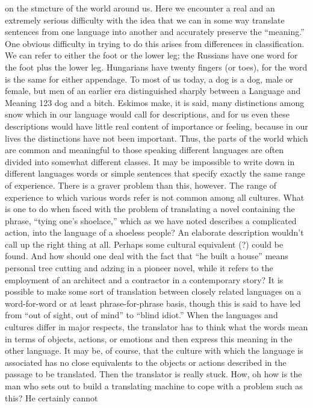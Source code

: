 {{{on the stmcture of the world around us. Here we encounter
a real and an extremely serious difficulty with the idea that we can
in some way translate sentences from one language into another
and accurately preserve the “meaning.”
One obvious difficulty in trying to do this arises from differences
in classification. We can refer to either the foot or the lower leg;
the Russians have one word for the foot plus the lower leg. Hungarians
have twenty fingers (or toes), for the word is the same for
either appendage. To most of us today, a dog is a dog, male or
female, but men of an earlier era distinguished sharply between a
Language and Meaning
123
dog and a bitch. Eskimos make, it is said, many distinctions among
snow which in our language would call for descriptions, and for
us even these descriptions would have little real content of importance
or feeling, because in our lives the distinctions have not been
important. Thus, the parts of the world which are common and
meaningful to those speaking different languages are often divided
into somewhat different classes. It may be impossible to write down
in different languages words or simple sentences that specify exactly
the same range of experience.
There is a graver problem than this, however. The range of
experience to which various words refer is not common among all
cultures. What is one to do when faced with the problem of translating
a novel containing the phrase, “tying one’s shoelace,” which
as we have noted describes a complicated action, into the language
of a shoeless people? An elaborate description wouldn’t call up the
right thing at all. Perhaps some cultural equivalent (?) could be
found. And how should one deal with the fact that “he built a
house” means personal tree cutting and adzing in a pioneer novel,
while it refers to the employment of an architect and a contractor
in a contemporary story?
It is possible to make some sort of translation between closely
related languages on a word-for-word or at least phrase-for-phrase
basis, though this is said to have led from “out of sight, out of
mind” to “blind idiot.” When the languages and cultures differ in
major respects, the translator has to think what the words mean
in terms of objects, actions, or emotions and then express this
meaning in the other language. It may be, of course, that the culture
with which the language is associated has no close equivalents
to the objects or actions described in the passage to be translated.
Then the translator is really stuck.
How, oh how is the man who sets out to build a translating
machine to cope with a problem such as this? He certainly cannot
}}}
